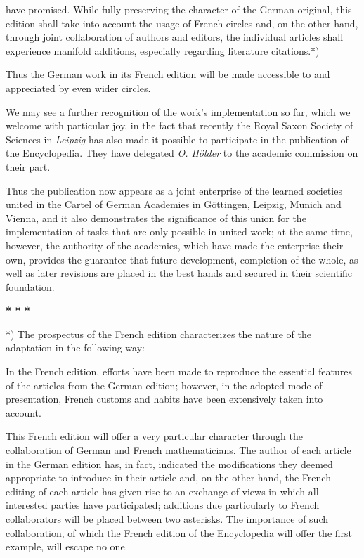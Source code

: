 \thispagestyle{fancy}

\vspace{0.5cm}

have promised. While fully preserving the character of the German original, this edition shall take into account the usage of French circles and, on the other hand, through joint collaboration of authors and editors, the individual articles shall experience manifold additions, especially regarding literature citations.*)

Thus the German work in its French edition will be made accessible to and appreciated by even wider circles.

We may see a further recognition of the work's implementation so far, which we welcome with particular joy, in the fact that recently the Royal Saxon Society of Sciences in \textit{Leipzig} has also made it possible to participate in the publication of the Encyclopedia. They have delegated \textit{O. Hölder} to the academic commission on their part.

Thus the publication now appears as a joint enterprise of the learned societies united in the Cartel of German Academies in Göttingen, Leipzig, Munich and Vienna, and it also demonstrates the significance of this union for the implementation of tasks that are only possible in united work; at the same time, however, the authority of the academies, which have made the enterprise their own, provides the guarantee that future development, completion of the whole, as well as later revisions are placed in the best hands and secured in their scientific foundation.

\centerline{\textbf{* * *}}

\vfill
\leftline{\rule{2in}{0.4pt}}
\vspace{0.2cm}
{\footnotesize 

*) The prospectus of the French edition characterizes the nature of the adaptation in the following way:

In the French edition, efforts have been made to reproduce the essential features of the articles from the German edition; however, in the adopted mode of presentation, French customs and habits have been extensively taken into account.

This French edition will offer a very particular character through the collaboration of German and French mathematicians. The author of each article in the German edition has, in fact, indicated the modifications they deemed appropriate to introduce in their article and, on the other hand, the French editing of each article has given rise to an exchange of views in which all interested parties have participated; additions due particularly to French collaborators will be placed between two asterisks. The importance of such collaboration, of which the French edition of the Encyclopedia will offer the first example, will escape no one.

}
